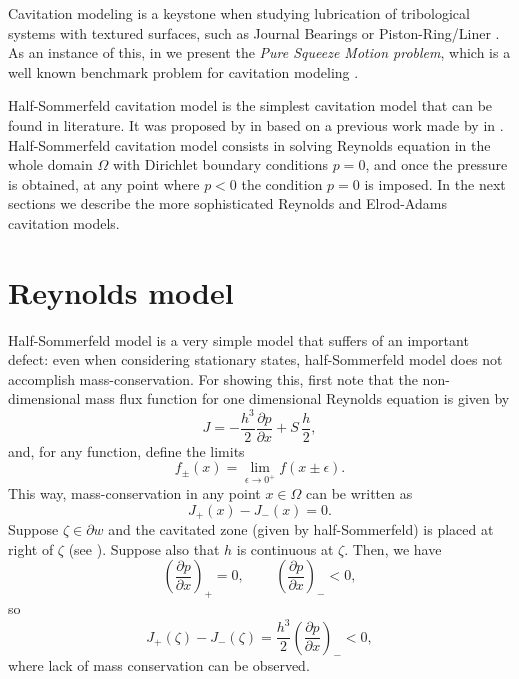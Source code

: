 Cavitation modeling is a keystone when studying lubrication of tribological systems with textured surfaces, such as Journal Bearings or Piston-Ring/Liner \cite{priest2000,ausas07}. As an instance of this, in  we present the \textit{Pure Squeeze Motion problem}, which is a  well known benchmark problem for cavitation modeling \cite{optasanu2000,ausas07}. 

Half-Sommerfeld cavitation model is the simplest  cavitation model that can be found in literature. It was proposed by \citeauthor{gumbel1921} in \citeyear{gumbel1921} \cite{gumbel1921} based on a previous work made by \citeauthor{sommerfeld1904} in \citeyear{sommerfeld1904} \cite{sommerfeld1904}. Half-Sommerfeld cavitation model consists in solving Reynolds equation in the whole domain $\Omega$ with Dirichlet boundary conditions $p=0$, and once the pressure is obtained, at any point where $p<0$ the condition $p=0$ is imposed. In the next sections we describe the more sophisticated Reynolds and Elrod-Adams cavitation models.
\section{Reynolds model}\label{sec:reynolds_model}
Half-Sommerfeld model is a very simple model that suffers of an important defect: even when considering stationary states, half-Sommerfeld model does not accomplish mass-conservation. For showing this, first note that the non-dimensional mass flux function for one dimensional Reynolds equation is given by
\begin{equation}
J=-\frac{h^3}{2}\frac{\partial p}{\partial x	}+S\,\frac{h}{2},\label{eq:flux_J_reynolds}
\end{equation}
and, for any function, define the limits
$$f_\pm(x)=\underset{\epsilon \rightarrow 0^+}{\lim}f(x\pm\epsilon).$$
This way, mass-conservation in any point $x\in\Omega$ can be written as
\begin{equation*}
J_+(x)-J_-(x)=0.
\end{equation*}
Suppose $\zeta\in\partial w$ and the cavitated zone (given by half-Sommerfeld) is placed at right of $\zeta$ (see ). Suppose also that $h$ is continuous at $\zeta$. Then,  we have 
$$\left(\frac{\partial p}{\partial x}\right)_+=0,\qquad \,\left(\frac{\partial p}{\partial x}\right)_-<0,$$
so 
$$J_+(\zeta)-J_-(\zeta)=\frac{h^3}{2}\left(\frac{\partial p}{\partial x	}\right)_-<0,$$
where lack of mass conservation can be observed.

